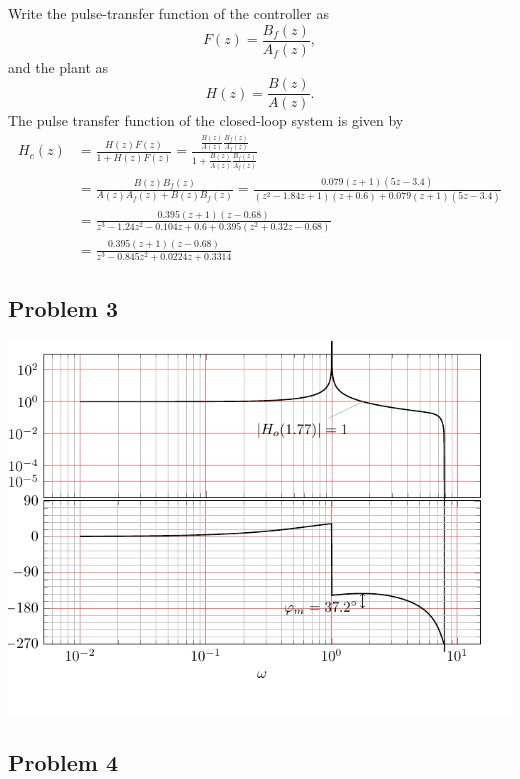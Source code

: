 \documentclass{scrartcl}
\begin{document}
Write the pulse-transfer function of the controller as 
\[ F(z) = \frac{B_f(z)}{A_f(z)}, \] and the plant as
\[ H(z) = \frac{B(z)}{A(z)}. \]
The pulse transfer function of the closed-loop system is given by
\begin{equation*}
\begin{split}
H_c(z) &= \frac{H(z)F(z)}{1 + H(z)F(z)} = \frac{\frac{B(z)}{A(z)}\frac{B_f(z)}{A_f(z)}}{1 + \frac{B(z)}{A(z)}\frac{B_f(z)}{A_f(z)}}\\
       &= \frac{B(z)B_f(z)}{A(z)A_f(z) + B(z)B_f(z)} = \frac{0.079(z+1)(5z-3.4)}{(z^2 -1.84z + 1)(z+0.6) +  0.079(z+1)(5z-3.4)}\\
       &= \frac{0.395(z+1)(z-0.68)}{z^3 -1.24z^2 -0.104z + 0.6 + 0.395(z^2 + 0.32z-0.68)}\\
       &= \frac{0.395(z+1)(z-0.68)}{z^3 -0.845z^2 + 0.0224z + 0.3314}
\end{split}
\end{equation*}
\subsection*{Problem 3}
\label{sec-6-3}

\begin{center}
\includegraphics[]{bode-open-sol}
\end{center}
\subsection*{Problem 4}
\label{sec-6-4}
\end{document}
